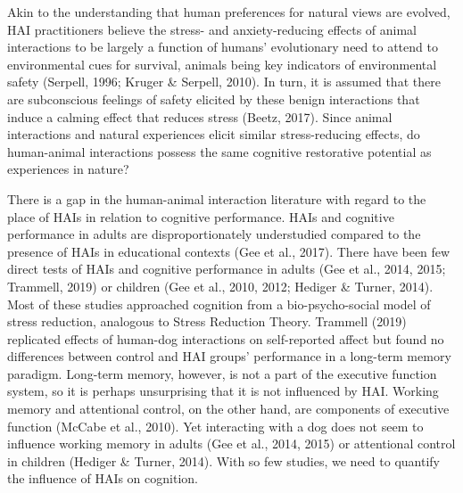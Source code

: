 \documentclass[
  english,
  pub,floatsintext]{apa6}
\begin{document}
Akin to the understanding that human preferences for natural views are evolved, HAI practitioners believe the stress- and anxiety-reducing effects of animal interactions to be largely a function of humans' evolutionary need to attend to environmental cues for survival, animals being key indicators of environmental safety (Serpell, 1996; Kruger \& Serpell, 2010). In turn, it is assumed that there are subconscious feelings of safety elicited by these benign interactions that induce a calming effect that reduces stress (Beetz, 2017). Since animal interactions and natural experiences elicit similar stress-reducing effects, do human-animal interactions possess the same cognitive restorative potential as experiences in nature?

There is a gap in the human-animal interaction literature with regard to the place of HAIs in relation to cognitive performance. HAIs and cognitive performance in adults are disproportionately understudied compared to the presence of HAIs in educational contexts (Gee et al., 2017). There have been few direct tests of HAIs and cognitive performance in adults (Gee et al., 2014, 2015; Trammell, 2019) or children (Gee et al., 2010, 2012; Hediger \& Turner, 2014). Most of these studies approached cognition from a bio-psycho-social model of stress reduction, analogous to Stress Reduction Theory. Trammell (2019) replicated effects of human-dog interactions on self-reported affect but found no differences between control and HAI groups' performance in a long-term memory paradigm. Long-term memory, however, is not a part of the executive function system, so it is perhaps unsurprising that it is not influenced by HAI. Working memory and attentional control, on the other hand, are components of executive function (McCabe et al., 2010). Yet interacting with a dog does not seem to influence working memory in adults (Gee et al., 2014, 2015) or attentional control in children (Hediger \& Turner, 2014). With so few studies, we need to quantify the influence of HAIs on cognition.
\end{document}
